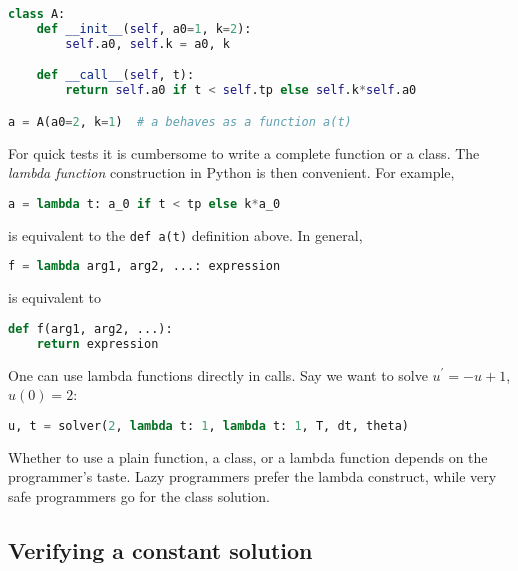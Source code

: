 \documentclass[graybox,sectrefs,envcountresetchap,open=right,final]{svmonodo}
\begin{document}
\begin{lstlisting}[language=python,style=blue1_bluegreen]
class A:
    def __init__(self, a0=1, k=2):
        self.a0, self.k = a0, k

    def __call__(self, t):
        return self.a0 if t < self.tp else self.k*self.a0

a = A(a0=2, k=1)  # a behaves as a function a(t)

\end{lstlisting}



For quick tests it is cumbersome to write a complete function or a class.
The \emph{lambda function} construction in Python is then convenient. For example,


\begin{lstlisting}[language=python,style=blue1_bluegreen]
a = lambda t: a_0 if t < tp else k*a_0

\end{lstlisting}

is equivalent to the \texttt{def a(t)} definition above. In general,


\begin{lstlisting}[language=python,style=blue1_bluegreen]
f = lambda arg1, arg2, ...: expression

\end{lstlisting}

is equivalent to



\begin{lstlisting}[language=python,style=blue1_bluegreen]
def f(arg1, arg2, ...):
    return expression

\end{lstlisting}

One can use lambda functions directly in calls. Say we want to
solve $u^{\prime}=-u+1$, $u(0)=2$:


\begin{lstlisting}[language=python,style=blue1_bluegreen]
u, t = solver(2, lambda t: 1, lambda t: 1, T, dt, theta)

\end{lstlisting}


Whether to use a plain function, a class, or a lambda function depends
on the programmer's taste. Lazy programmers prefer the lambda construct, while
very safe programmers go for the class solution.

\subsection{Verifying a constant solution}
\label{decay:verify:trivial}
\end{document}
